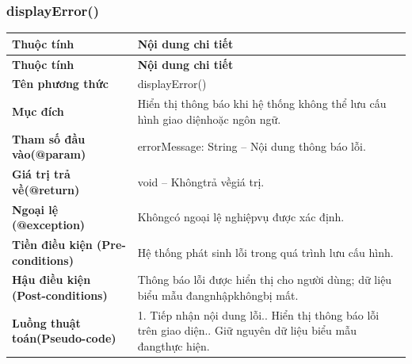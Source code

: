 \subsubsection{displayError()}
\begin{longtable}{|L{0.24\textwidth}|L{0.70\textwidth}|}
\hline
\textbf{Thuộc tính} & \textbf{Nội dung chi tiết} \\
\hline
\endfirsthead
\hline
\textbf{Thuộc tính} & \textbf{Nội dung chi tiết} \\
\hline
\endhead
\textbf{Tên phương thức} & displayError() \\
\hline
\textbf{Mục đích} & Hiển thị thông báo khi hệ thống không thể lưu cấu hình giao diện\newline hoặc ngôn ngữ. \\
\hline
\textbf{Tham số đầu vào}\newline \textbf{(@param)} & errorMessage: String – Nội dung thông báo lỗi. \\
\hline
\textbf{Giá trị trả về(@return)} & void – Khôngtrả vềgiá trị. \\
\hline
\textbf{Ngoại lệ (@exception)} & Khôngcó ngoại lệ nghiệpvụ được xác định. \\
\hline
\textbf{Tiền điều kiện (Pre-}\newline \textbf{conditions)} & Hệ thống phát sinh lỗi trong quá trình lưu cấu hình. \\
\hline
\textbf{Hậu điều kiện (Post-}\newline \textbf{conditions)} & Thông báo lỗi được hiển thị cho người dùng; dữ liệu biểu mẫu đang\newline nhậpkhôngbị mất. \\
\hline
\textbf{Luồng thuật toán}\newline \textbf{(Pseudo-code)} & 1. Tiếp nhận nội dung lỗi.. Hiển thị thông báo lỗi trên giao diện.. Giữ nguyên dữ liệu biểu mẫu đangthực hiện. \\
\hline
\end{longtable}
\vspace{-0.5\baselineskip}
